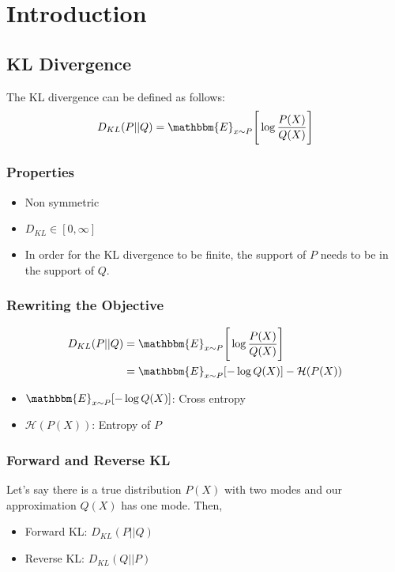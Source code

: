 \chapter{Introduction}
\section{KL Divergence}
The KL divergence can be defined as follows:
\begin{align*}
	D_{KL}(P||Q) = \mathbbm{E}_{x\sim P}\Bigg[\log \frac{P(X)}{Q(X)}\Bigg]
\end{align*}

\subsection{Properties}
\begin{itemize}
	\item Non symmetric
	\item $D_{KL} \in [0,\infty]$ 
	\item In order for the KL divergence to be finite, the support of $P$ needs to be in the support of $Q$. 
\end{itemize}

\subsection{Rewriting the Objective}
\begin{align*}
	D_{KL}(P||Q) &= \mathbbm{E}_{x\sim P}\Bigg[\log \frac{P(X)}{Q(X)}\Bigg]\\
	&= \mathbbm{E}_{x\sim P} [-\log Q(X)] - \mathcal{H}(P(X))
\end{align*}

\begin{itemize}
	\item $\mathbbm{E}_{x\sim P} [-\log Q(X)]$: Cross entropy
	\item $\mathcal{H}(P(X))$: Entropy of $P$
\end{itemize}

\subsection{Forward and Reverse KL}

Let's say there is a true distribution $P(X)$ with two modes and our approximation $Q(X)$ has one mode. Then,

\begin{itemize}
	\item Forward KL: $D_{KL}(P||Q)$
	\item Reverse KL: $D_{KL}(Q||P)$
\end{itemize}

